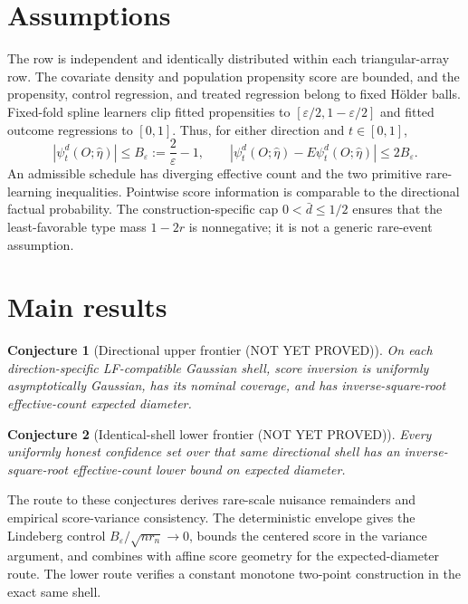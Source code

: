 \documentclass[11pt]{article}
\newtheorem{conjecture}{Conjecture}
\begin{document}
\section{Assumptions}
The row is independent and identically distributed within each triangular-array row.  The covariate density and population propensity score are bounded, and the propensity, control regression, and treated regression belong to fixed Hölder balls.  Fixed-fold spline learners clip fitted propensities to \([\varepsilon/2,1-\varepsilon/2]\) and fitted outcome regressions to \([0,1]\).  Thus, for either direction and \(t\in[0,1]\),
\[
 |\psi_t^d(O;\widehat\eta)|\le B_\varepsilon:=\frac{2}{\varepsilon}-1,
 \qquad |\psi_t^d(O;\widehat\eta)-E\psi_t^d(O;\widehat\eta)|\le2B_\varepsilon.
\]
An admissible schedule has diverging effective count and the two primitive rare-learning inequalities.  Pointwise score information is comparable to the directional factual probability.  The construction-specific cap \(0<\bar d\le1/2\) ensures that the least-favorable type mass \(1-2r\) is nonnegative; it is not a generic rare-event assumption.

\section{Main results}
\begin{conjecture}[Directional upper frontier (NOT YET PROVED)]
On each direction-specific LF-compatible Gaussian shell, score inversion is uniformly asymptotically Gaussian, has its nominal coverage, and has inverse-square-root effective-count expected diameter.
\end{conjecture}
\begin{conjecture}[Identical-shell lower frontier (NOT YET PROVED)]
Every uniformly honest confidence set over that same directional shell has an inverse-square-root effective-count lower bound on expected diameter.
\end{conjecture}
The route to these conjectures derives rare-scale nuisance remainders and empirical score-variance consistency.  The deterministic envelope gives the Lindeberg control \(B_\varepsilon/\sqrt{nr_n}\to0\), bounds the centered score in the variance argument, and combines with affine score geometry for the expected-diameter route.  The lower route verifies a constant monotone two-point construction in the exact same shell.
\end{document}
